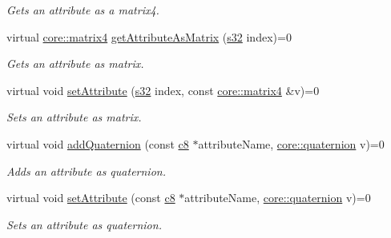 \begin{DoxyCompactItemize}
\begin{DoxyCompactList}\small\item\em Gets an attribute as a matrix4. \end{DoxyCompactList}\item 
virtual \hyperlink{namespaceirr_1_1core_a4c9d4e29899535971052810954a14431}{core\+::matrix4} \hyperlink{classirr_1_1io_1_1IAttributes_aaceb2fc0fca684d941918ce18d876336}{get\+Attribute\+As\+Matrix} (\hyperlink{namespaceirr_ac66849b7a6ed16e30ebede579f9b47c6}{s32} index)=0
\begin{DoxyCompactList}\small\item\em Gets an attribute as matrix. \end{DoxyCompactList}\item 
\mbox{\label{classirr_1_1io_1_1IAttributes_ae25f3ab5a4e8a8f27f4678c07b16e021}} 
virtual void \hyperlink{classirr_1_1io_1_1IAttributes_ae25f3ab5a4e8a8f27f4678c07b16e021}{set\+Attribute} (\hyperlink{namespaceirr_ac66849b7a6ed16e30ebede579f9b47c6}{s32} index, const \hyperlink{namespaceirr_1_1core_a4c9d4e29899535971052810954a14431}{core\+::matrix4} \&v)=0
\begin{DoxyCompactList}\small\item\em Sets an attribute as matrix. \end{DoxyCompactList}\item 
\mbox{\label{classirr_1_1io_1_1IAttributes_af502127e96f12c3d4dc506455e586acc}} 
virtual void \hyperlink{classirr_1_1io_1_1IAttributes_af502127e96f12c3d4dc506455e586acc}{add\+Quaternion} (const \hyperlink{namespaceirr_a9395eaea339bcb546b319e9c96bf7410}{c8} $\ast$attribute\+Name, \hyperlink{classirr_1_1core_1_1quaternion}{core\+::quaternion} v)=0
\begin{DoxyCompactList}\small\item\em Adds an attribute as quaternion. \end{DoxyCompactList}\item 
\mbox{\label{classirr_1_1io_1_1IAttributes_a12488b48428edb2b0979f42a5cc6377a}} 
virtual void \hyperlink{classirr_1_1io_1_1IAttributes_a12488b48428edb2b0979f42a5cc6377a}{set\+Attribute} (const \hyperlink{namespaceirr_a9395eaea339bcb546b319e9c96bf7410}{c8} $\ast$attribute\+Name, \hyperlink{classirr_1_1core_1_1quaternion}{core\+::quaternion} v)=0
\begin{DoxyCompactList}\small\item\em Sets an attribute as quaternion. \end{DoxyCompactList}\item 

\end{DoxyCompactItemize}
